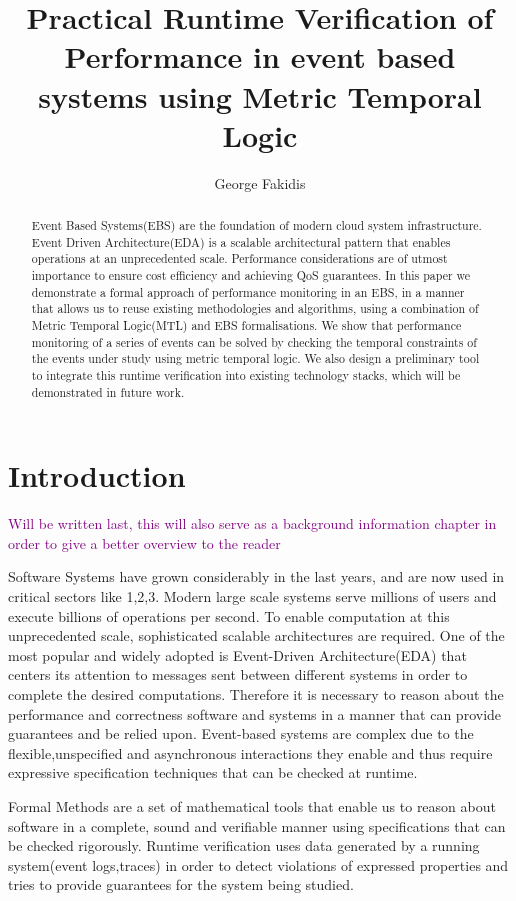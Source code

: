 \documentclass[twocolumn]{article}
\title{Practical Runtime Verification of Performance in event based systems using Metric Temporal Logic}
\author{George Fakidis}
\newcommand{\note}[1] {
	\textcolor{Purple}{#1}

}
\begin{document}
\maketitle
\begin{abstract}
	Event Based Systems(EBS) are the foundation of modern cloud system infrastructure. Event Driven Architecture(EDA) is a scalable architectural pattern that enables operations at an unprecedented scale. Performance considerations are of utmost importance to ensure cost efficiency and achieving QoS guarantees.
	In this paper we demonstrate a formal approach of performance monitoring in an EBS, in a manner that allows us to reuse existing methodologies and algorithms, using a combination of Metric Temporal Logic(MTL) and EBS formalisations.
	We show that performance monitoring of a series of events can be solved by checking the temporal constraints of the events under study using metric temporal logic.
	We also design a preliminary tool to integrate this runtime verification into existing technology stacks, which will be demonstrated in future work.
\end{abstract}


\section{Introduction}

\note{Will be written last, this will also serve as a background information chapter in order to give a better overview to the reader}

Software Systems have grown considerably in the last years, and are now used in critical sectors like 1,2,3.
Modern large scale systems serve millions of users and execute billions of operations per second.
To enable computation at this unprecedented scale, sophisticated scalable architectures are required.
One of the most popular and widely adopted is Event-Driven Architecture(EDA) that centers its attention to messages sent between different systems in order to complete the desired computations.
Therefore it is necessary to reason about the performance and correctness software and systems in a manner that can provide guarantees and be relied upon. Event-based systems are complex due to the flexible,unspecified and asynchronous interactions they enable and thus require expressive specification techniques that can be checked at runtime.
\par
Formal Methods are a set of mathematical tools that enable us to reason about software in a complete, sound and verifiable manner using specifications that can be checked rigorously. Runtime verification uses data generated by a running system(event logs,traces) in order to detect violations of expressed properties and tries to provide guarantees for the system being studied.
\end{document}
